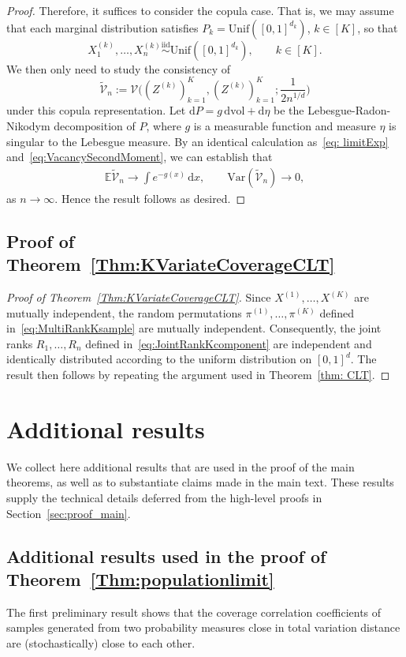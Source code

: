 \documentclass[11pt]{article}
\begin{document}
\begin{proof}
Therefore, it suffices to consider the copula case. That is, we may assume that
each marginal distribution satisfies $P_k=\mathrm{Unif}([0, 1]^{d_k})$, $k\in[K]$, so that
\[
X_1^{(k)},\ldots,X_n^{(k)}\stackrel{\mathrm{iid}}{\sim}\mathrm{Unif}([0, 1]^{d_k}),
\qquad k\in[K].
\]
We then only need to study the consistency of
\[
\widetilde{\mathcal{V}}_{n}:=\mathcal{V}\biggl((Z^{(k)})_{k = 1}^K,(Z^{(k)})_{k = 1}^K;\frac{1}{2n^{1/d}}\biggr)
\]
under this copula representation. Let $\mathrm{d}P = g\, \mathrm{d}\mathrm{vol} + \mathrm{d}\eta$ be the Lebesgue-Radon-Nikodym decomposition of $P$, where $g$ is a measurable function and measure $\eta$ is singular to the Lebesgue measure. By an identical calculation as~\eqref{eq: limitExp} and~\eqref{eq:VacancySecondMoment}, we can establish that 
\begin{align*}
    \mathbb{E}\widetilde{\mathcal{V}}_{n} \rightarrow \int e^{-g(x)} \, \mathrm{d}x , \qquad \mathrm{Var}(\widetilde{\mathcal{V}}_{n})\rightarrow 0,
\end{align*}
as $n \to \infty$. Hence the result follows as desired. 
\end{proof} 


\subsection{Proof of Theorem~\ref{Thm:KVariateCoverageCLT}}
\begin{proof}[Proof of Theorem~\ref{Thm:KVariateCoverageCLT}]
Since $X^{(1)},\ldots,X^{(K)}$ are mutually independent, the random permutations $\pi^{(1)}, \ldots, \pi^{(K)}$ defined in~\eqref{eq:MultiRankKsample} are mutually independent. Consequently, the joint ranks $R_1,\ldots,R_n$ defined in~\eqref{eq:JointRankKcomponent} are independent and identically distributed according to the uniform distribution on $[0,1]^{d}$. The result then follows by repeating the argument used in Theorem~\ref{thm: CLT}.
\end{proof}


\section{Additional results}
\label{sec:additional-results}
We collect here additional results that are used in the proof of the main theorems, as well as to substantiate claims made in the main text. These results supply the technical details deferred from the high-level proofs in Section~\ref{sec:proof_main}.

\subsection{Additional results used in the proof of Theorem~\ref{Thm:populationlimit}}
The first preliminary result shows that the coverage correlation coefficients of samples generated from two probability measures close in total variation distance are (stochastically) close to each other. 
\end{document}
